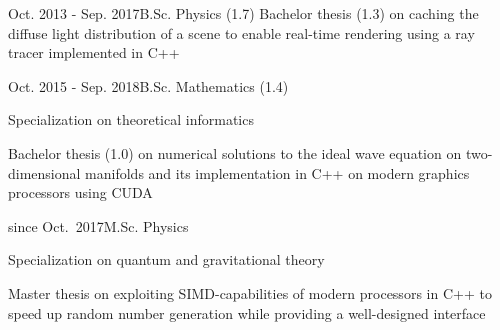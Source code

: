 \documentclass[a4paper,10pt]{cv}
\begin{document}
      \begin{cvTimeItem}{Oct. 2013 - Sep. 2017}{B.Sc. Physics (1.7)}
        Bachelor thesis  (1.3) on caching the diffuse light distribution of a scene to enable real-time rendering using a ray tracer implemented in C++
      \end{cvTimeItem}
      \begin{cvTimeItem}{Oct. 2015 - Sep. 2018}{B.Sc. Mathematics (1.4)}
        \begin{cvItemize}
          \item Specialization on theoretical informatics
          \item Bachelor thesis  (1.0) on numerical solutions to the ideal wave equation on two-dimensional manifolds and its implementation in C++ on modern graphics processors using CUDA
        \end{cvItemize}
      \end{cvTimeItem}
      \begin{cvTimeItem}{since Oct.~2017}{M.Sc. Physics}
        \begin{cvItemize}
          \item Specialization on quantum and gravitational theory
          \item Master thesis  on exploiting SIMD-capabilities of modern processors in C++ to speed up random number generation while providing a well-designed interface
        \end{cvItemize}
      \end{cvTimeItem}
\end{document}
